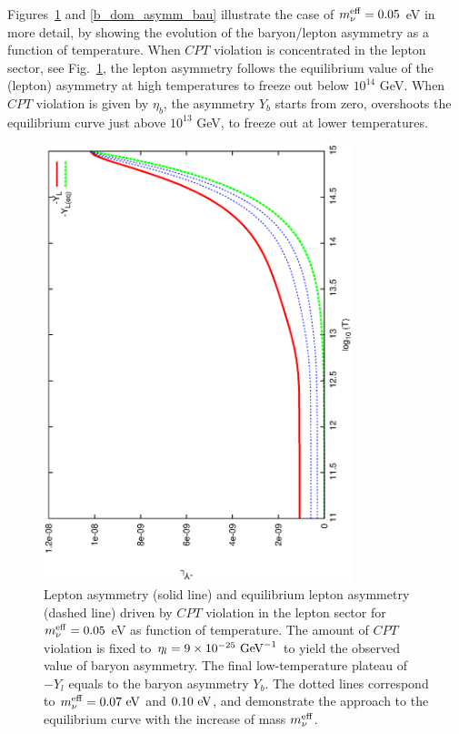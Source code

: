 \documentclass[12pt]{revtex4}
\newcommand{\meff}{m^{\rm eff}_\nu}
\newcommand{\GeV}{{\rm GeV}}
\newcommand{\eV}{{\rm eV}}
\begin{document}
	Figures~\ref{l_dom_asymm_bau} and \ref{b_dom_asymm_bau} illustrate the 
	case of $\meff=0.05$ eV in more detail, by showing the evolution of the baryon/lepton
	asymmetry as a function of temperature. When $CPT$ violation is concentrated in the 
lepton sector, see Fig.~\ref{l_dom_asymm_bau}, the lepton asymmetry follows the 
equilibrium value of the (lepton)
	asymmetry at high temperatures to freeze out below $10^{14}$ GeV.
When $CPT$ violation is given by $\eta_b$, the asymmetry $ Y_b $ starts from zero, 
    overshoots the equilibrium curve just above $10^{13}$ GeV, to freeze out
	at lower temperatures. 


\begin{figure}
\includegraphics[width=9cm,angle=270]{l_dom_asymm_bau.ps}
\caption{
	Lepton asymmetry (solid line) and equilibrium lepton asymmetry (dashed line) 
driven by $CPT$ violation in the lepton sector
    for $\meff=0.05$ eV as function of temperature.
	The amount of $CPT$ violation is fixed to $ \eta_l = 9 \times 10^{-25}~\GeV^{-1} $ 
	to yield the observed value of baryon asymmetry.
	The final low-temperature plateau of $-Y_l$ equals to the baryon asymmetry $Y_b$. 
	The dotted lines correspond to $ \meff = 0.07~\eV $ and $ 0.10~\eV $, and 
	demonstrate the approach to the equilibrium curve with the increase 
	of mass $ \meff $.
	}
\label{l_dom_asymm_bau}
\end{figure}
\end{document}
